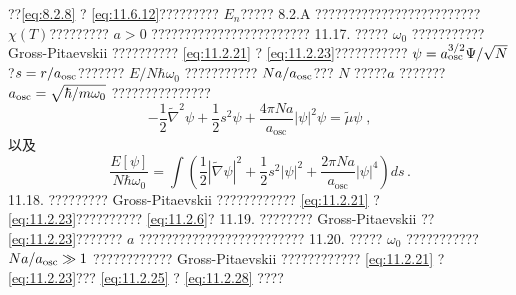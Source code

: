 ??\autoref{eq:8.2.8} ? \autoref{eq:11.6.12}????????? \(E_{n}\)????? 8.2.A ????????????????????????? \(\chi(T)\)????????? \(a > 0\) ????????????????????????
11.17. ????? \(\omega_0\) ??????????? Gross-Pitaevskii ?????????? \autoref{eq:11.2.21} ? \autoref{eq:11.2.23}??????????? \(\psi = a_{\rm osc}^{3/2}\Psi/\sqrt{N}\)?\(s = r/a_{\rm osc}\)??????? \(E/N\hbar\omega_0\) ??????????? \(Na/a_{\rm osc}\)??? \(N\) ?????\(a\) ??????? \(a_{\rm osc} = \sqrt{\hbar/m\omega_0}\) ???????????????
\begin{equation}\tag{11.6.113}\label{eq:11.6.113}
- \frac { 1 } { 2 } \tilde { \nabla } ^{2} \psi + \frac { 1 } { 2 } s ^{2} \psi + \frac { 4 \pi N a } { a _ { \mathrm { o s c } } } \left| \psi \right| ^{2} \psi = \tilde { \mu } \psi \; ,
\end{equation}
以及
\begin{equation}\tag{11.6.114}\label{eq:11.6.114}
\frac { E [ \psi ] } { N \hbar \omega _ { 0 } } = \int \left( \frac { 1 } { 2 } \left| \tilde { \nabla } \psi \right| ^{2} + \frac { 1 } { 2 } s ^{2} \left| \psi \right| ^{2} + \frac { 2 \pi N a } { a _ { \mathrm { o s c } } } \left| \psi \right| ^{4} \right) d s \, .
\end{equation}
11.18. ????????? Gross-Pitaevskii ???????????? \autoref{eq:11.2.21} ? \autoref{eq:11.2.23}?????????? \autoref{eq:11.2.6}?
11.19. ???????? Gross-Pitaevskii ?? \autoref{eq:11.2.23}??????? \(a\) ?????????????????????????
11.20. ????? \(\omega_0\) ??????????? \(Na/a_{\rm osc} \gg 1\) ???????????? Gross-Pitaevskii ???????????? \autoref{eq:11.2.21} ? \autoref{eq:11.2.23}??? \autoref{eq:11.2.25} ? \autoref{eq:11.2.28} ????


